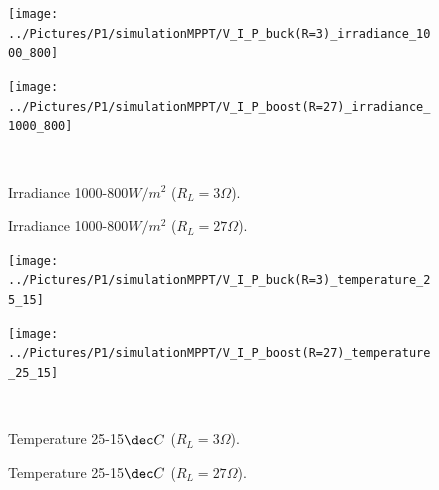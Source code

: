 \begin{figure}[H]
	\begin{minipage}[c]{0.5\textwidth}
		\centering
		\texttt{[image: ../Pictures/P1/simulationMPPT/V\_I\_P\_buck(R=3)\_irradiance\_1000\_800]} %
	\end{minipage}%
	\hfill
	\begin{minipage}[c]{0.5\textwidth}
		\centering
		\texttt{[image: ../Pictures/P1/simulationMPPT/V\_I\_P\_boost(R=27)\_irradiance\_1000\_800]} %
	\end{minipage} \\ %
	\begin{minipage}[t]{0.45\textwidth}
		\caption{Irradiance 1000-800$W/ m^2$ ($R_{L}=3\Omega$).} %
		\label{buckirradiance}
	\end{minipage}%
	\hfill
	\begin{minipage}[t]{0.45\textwidth}
		\caption{Irradiance 1000-800$W/ m^2$ ($R_{L}=27\Omega$).} %
		\label{boostirradiance}
	\end{minipage}
\end{figure}



\begin{figure}[H]
	\begin{minipage}[c]{0.5\textwidth}
		\centering
		\texttt{[image: ../Pictures/P1/simulationMPPT/V\_I\_P\_buck(R=3)\_temperature\_25\_15]} %
	\end{minipage}%
	\hfill
	\begin{minipage}[c]{0.5\textwidth}
		\centering
		\texttt{[image: ../Pictures/P1/simulationMPPT/V\_I\_P\_boost(R=27)\_temperature\_25\_15]} %
	\end{minipage} \\ %
	\begin{minipage}[t]{0.45\textwidth}
		\caption{Temperature 25-15$\dec C$ ($R_{L}=3\Omega$).} %
		\label{bucktemperature}
	\end{minipage}%
	\hfill
	\begin{minipage}[t]{0.45\textwidth}
		\caption{Temperature 25-15$\dec C$ ($R_{L}=27\Omega$).} %
		\label{boosttemperature}
	\end{minipage}
\end{figure}




